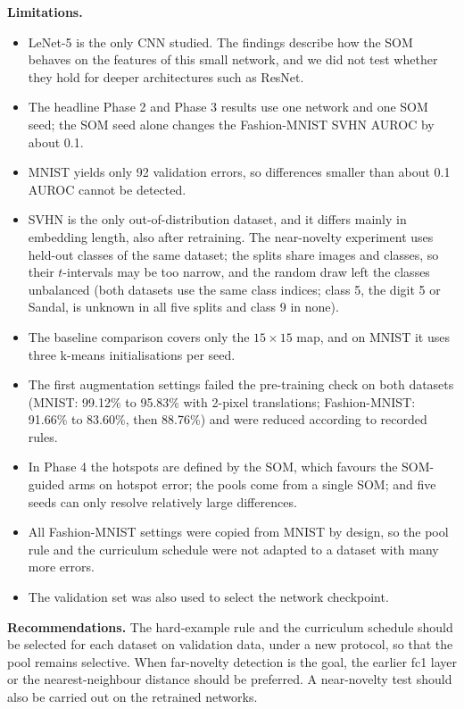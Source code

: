\documentclass{scrartcl}
\begin{document}
\textbf{Limitations.}
\begin{itemize}
  \item LeNet-5 is the only CNN studied. The findings describe how the SOM behaves on the features of this small network, and we did not test whether they hold for deeper architectures such as ResNet.
  \item The headline Phase 2 and Phase 3 results use one network and one SOM seed; the SOM seed alone changes the Fashion-MNIST SVHN AUROC by about 0.1.
  \item MNIST yields only 92 validation errors, so differences smaller than about 0.1 AUROC cannot be detected.
  \item SVHN is the only out-of-distribution dataset, and it differs mainly in embedding length, also after retraining. The near-novelty experiment uses held-out classes of the same dataset; the splits share images and classes, so their $t$-intervals may be too narrow, and the random draw left the classes unbalanced (both datasets use the same class indices; class 5, the digit 5 or Sandal, is unknown in all five splits and class 9 in none).
  \item The baseline comparison covers only the $15\times15$ map, and on MNIST it uses three k-means initialisations per seed.
  \item The first augmentation settings failed the pre-training check on both datasets (MNIST: 99.12\% to 95.83\% with 2-pixel translations; Fashion-MNIST: 91.66\% to 83.60\%, then 88.76\%) and were reduced according to recorded rules.
  \item In Phase 4 the hotspots are defined by the SOM, which favours the SOM-guided arms on hotspot error; the pools come from a single SOM; and five seeds can only resolve relatively large differences.
  \item All Fashion-MNIST settings were copied from MNIST by design, so the pool rule and the curriculum schedule were not adapted to a dataset with many more errors.
  \item The validation set was also used to select the network checkpoint.
\end{itemize}

\textbf{Recommendations.} The hard-example rule and the curriculum schedule should be selected for each dataset on validation data, under a new protocol, so that the pool remains selective. When far-novelty detection is the goal, the earlier fc1 layer or the nearest-neighbour distance should be preferred. A near-novelty test should also be carried out on the retrained networks.
\end{document}
